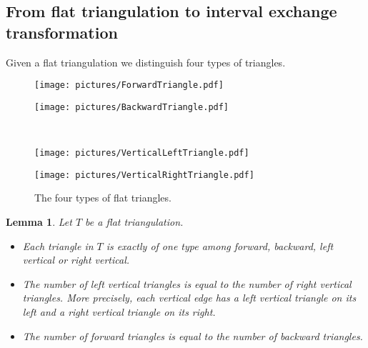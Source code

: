\documentclass{article}
\newtheorem{lemma}[definition]{Lemma}
\begin{document}
\subsection{From flat triangulation to interval exchange transformation}
Given a flat triangulation we distinguish four types of triangles.
\begin{figure}[!ht]\begin{center}
\begin{minipage}{0.4\textwidth}
\begin{center}\texttt{[image: pictures/ForwardTriangle.pdf]}\end{center}
\end{minipage}
\hspace{0.1\textwidth}
\begin{minipage}{0.4\textwidth}
\begin{center}\texttt{[image: pictures/BackwardTriangle.pdf]}\end{center}
\end{minipage} \\
\begin{minipage}{0.4\textwidth}
\begin{center}\texttt{[image: pictures/VerticalLeftTriangle.pdf]}\end{center}
\end{minipage}
\hspace{0.1\textwidth}
\begin{minipage}{0.4\textwidth}
\begin{center}\texttt{[image: pictures/VerticalRightTriangle.pdf]}\end{center}
\end{minipage}
\caption{The four types of flat triangles.}
\end{center}\end{figure}
\begin{lemma}
Let $T$ be a flat triangulation.
\begin{itemize}
\item Each triangle in $T$ is exactly of one type among forward, backward, left vertical or right vertical.
\item The number of left vertical triangles is equal to the number of right vertical triangles. More precisely, each vertical
edge has a left vertical triangle on its left and a right vertical triangle on its right.
\item The number of forward triangles is equal to the number of backward triangles.
\end{itemize}
\end{lemma}
\end{document}
